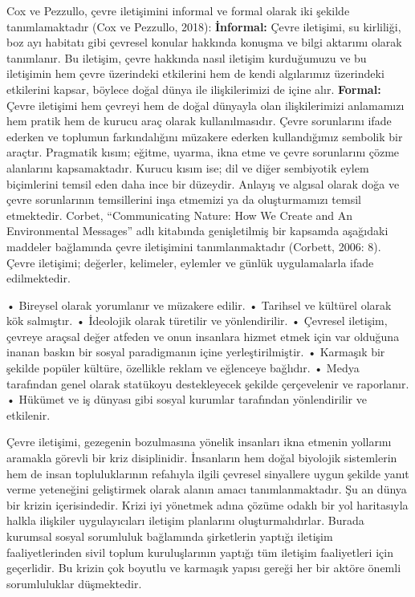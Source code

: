\documentclass[
]{book}
\begin{document}
Cox ve Pezzullo, çevre iletişimini informal ve formal olarak iki şekilde tanımlamaktadır (Cox ve Pezzullo, 2018):
\textbf{İnformal:} Çevre iletişimi, su kirliliği, boz ayı habitatı gibi çevresel konular hakkında konuşma ve bilgi aktarımı olarak tanımlanır. Bu iletişim, çevre hakkında nasıl iletişim kurduğumuzu ve bu iletişimin hem çevre üzerindeki etkilerini hem de kendi algılarımız üzerindeki etkilerini kapsar, böylece doğal dünya ile ilişkilerimizi de içine alır.
\textbf{Formal:} Çevre iletişimi hem çevreyi hem de doğal dünyayla olan ilişkilerimizi anlamamızı hem pratik hem de kurucu araç olarak kullanılmasıdır. Çevre sorunlarını ifade ederken ve toplumun farkındalığını müzakere ederken kullandığımız sembolik bir araçtır. Pragmatik kısım; eğitme, uyarma, ikna etme ve çevre sorunlarını çözme alanlarını kapsamaktadır. Kurucu kısım ise; dil ve diğer sembiyotik eylem biçimlerini temsil eden daha ince bir düzeydir. Anlayış ve algısal olarak doğa ve çevre sorunlarının temsillerini inşa etmemizi ya da oluşturmamızı temsil etmektedir.
Corbet, ``Communicating Nature: How We Create and An Environmental Messages'' adlı kitabında genişletilmiş bir kapsamda aşağıdaki maddeler bağlamında çevre iletişimini tanımlanmaktadır (Corbett, 2006: 8). Çevre iletişimi; değerler, kelimeler, eylemler ve günlük uygulamalarla ifade edilmektedir.

• Bireysel olarak yorumlanır ve müzakere edilir.
• Tarihsel ve kültürel olarak kök salmıştır.
• İdeolojik olarak türetilir ve yönlendirilir.
• Çevresel iletişim, çevreye araçsal değer atfeden ve onun insanlara hizmet etmek için var olduğuna inanan baskın bir sosyal paradigmanın içine yerleştirilmiştir.
• Karmaşık bir şekilde popüler kültüre, özellikle reklam ve eğlenceye bağlıdır.
• Medya tarafından genel olarak statükoyu destekleyecek şekilde çerçevelenir ve raporlanır.
• Hükümet ve iş dünyası gibi sosyal kurumlar tarafından yönlendirilir ve etkilenir.

Çevre iletişimi, gezegenin bozulmasına yönelik insanları ikna etmenin yollarını aramakla görevli bir kriz disiplinidir. İnsanların hem doğal biyolojik sistemlerin hem de insan topluluklarının refahıyla ilgili çevresel sinyallere uygun şekilde yanıt verme yeteneğini geliştirmek olarak alanın amacı tanımlanmaktadır. Şu an dünya bir krizin içerisindedir. Krizi iyi yönetmek adına çözüme odaklı bir yol haritasıyla halkla ilişkiler uygulayıcıları iletişim planlarını oluşturmalıdırlar. Burada kurumsal sosyal sorumluluk bağlamında şirketlerin yaptığı iletişim faaliyetlerinden sivil toplum kuruluşlarının yaptığı tüm iletişim faaliyetleri için geçerlidir. Bu krizin çok boyutlu ve karmaşık yapısı gereği her bir aktöre önemli sorumluluklar düşmektedir.
\end{document}
